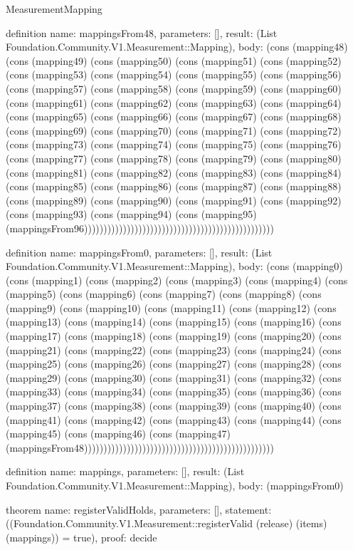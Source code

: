 \begin{lexlean}{MeasurementMapping}
\begin{semanticmodule}
definition{
  name: mappingsFrom48,
  parameters: [],
  result: (List Foundation.Community.V1.Measurement::Mapping),
  body: (cons (mapping48) (cons (mapping49) (cons (mapping50) (cons (mapping51) (cons (mapping52) (cons (mapping53) (cons (mapping54) (cons (mapping55) (cons (mapping56) (cons (mapping57) (cons (mapping58) (cons (mapping59) (cons (mapping60) (cons (mapping61) (cons (mapping62) (cons (mapping63) (cons (mapping64) (cons (mapping65) (cons (mapping66) (cons (mapping67) (cons (mapping68) (cons (mapping69) (cons (mapping70) (cons (mapping71) (cons (mapping72) (cons (mapping73) (cons (mapping74) (cons (mapping75) (cons (mapping76) (cons (mapping77) (cons (mapping78) (cons (mapping79) (cons (mapping80) (cons (mapping81) (cons (mapping82) (cons (mapping83) (cons (mapping84) (cons (mapping85) (cons (mapping86) (cons (mapping87) (cons (mapping88) (cons (mapping89) (cons (mapping90) (cons (mapping91) (cons (mapping92) (cons (mapping93) (cons (mapping94) (cons (mapping95) (mappingsFrom96)))))))))))))))))))))))))))))))))))))))))))))))))
}

definition{
  name: mappingsFrom0,
  parameters: [],
  result: (List Foundation.Community.V1.Measurement::Mapping),
  body: (cons (mapping0) (cons (mapping1) (cons (mapping2) (cons (mapping3) (cons (mapping4) (cons (mapping5) (cons (mapping6) (cons (mapping7) (cons (mapping8) (cons (mapping9) (cons (mapping10) (cons (mapping11) (cons (mapping12) (cons (mapping13) (cons (mapping14) (cons (mapping15) (cons (mapping16) (cons (mapping17) (cons (mapping18) (cons (mapping19) (cons (mapping20) (cons (mapping21) (cons (mapping22) (cons (mapping23) (cons (mapping24) (cons (mapping25) (cons (mapping26) (cons (mapping27) (cons (mapping28) (cons (mapping29) (cons (mapping30) (cons (mapping31) (cons (mapping32) (cons (mapping33) (cons (mapping34) (cons (mapping35) (cons (mapping36) (cons (mapping37) (cons (mapping38) (cons (mapping39) (cons (mapping40) (cons (mapping41) (cons (mapping42) (cons (mapping43) (cons (mapping44) (cons (mapping45) (cons (mapping46) (cons (mapping47) (mappingsFrom48)))))))))))))))))))))))))))))))))))))))))))))))))
}

definition{
  name: mappings,
  parameters: [],
  result: (List Foundation.Community.V1.Measurement::Mapping),
  body: (mappingsFrom0)
}

theorem{
  name: registerValidHolds,
  parameters: [],
  statement: ((Foundation.Community.V1.Measurement::registerValid (release) (items) (mappings)) = true),
  proof: decide{}
}
\end{semanticmodule}
\end{lexlean}
